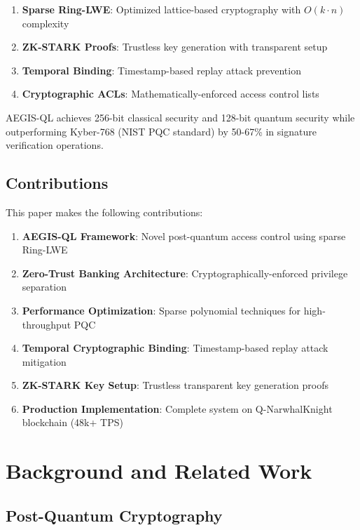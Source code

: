 \documentclass[11pt,a4paper]{article}
\begin{document}
\begin{enumerate}[leftmargin=*]
    \item \textbf{Sparse Ring-LWE}: Optimized lattice-based cryptography with $O(k \cdot n)$ complexity
    \item \textbf{ZK-STARK Proofs}: Trustless key generation with transparent setup
    \item \textbf{Temporal Binding}: Timestamp-based replay attack prevention
    \item \textbf{Cryptographic ACLs}: Mathematically-enforced access control lists
\end{enumerate}

AEGIS-QL achieves 256-bit classical security and 128-bit quantum security while outperforming Kyber-768 (NIST PQC standard) by 50-67\% in signature verification operations.

\subsection{Contributions}

This paper makes the following contributions:

\begin{enumerate}[leftmargin=*]
    \item \textbf{AEGIS-QL Framework}: Novel post-quantum access control using sparse Ring-LWE
    \item \textbf{Zero-Trust Banking Architecture}: Cryptographically-enforced privilege separation
    \item \textbf{Performance Optimization}: Sparse polynomial techniques for high-throughput PQC
    \item \textbf{Temporal Cryptographic Binding}: Timestamp-based replay attack mitigation
    \item \textbf{ZK-STARK Key Setup}: Trustless transparent key generation proofs
    \item \textbf{Production Implementation}: Complete system on Q-NarwhalKnight blockchain (48k+ TPS)
\end{enumerate}

\section{Background and Related Work}

\subsection{Post-Quantum Cryptography}
\end{document}
